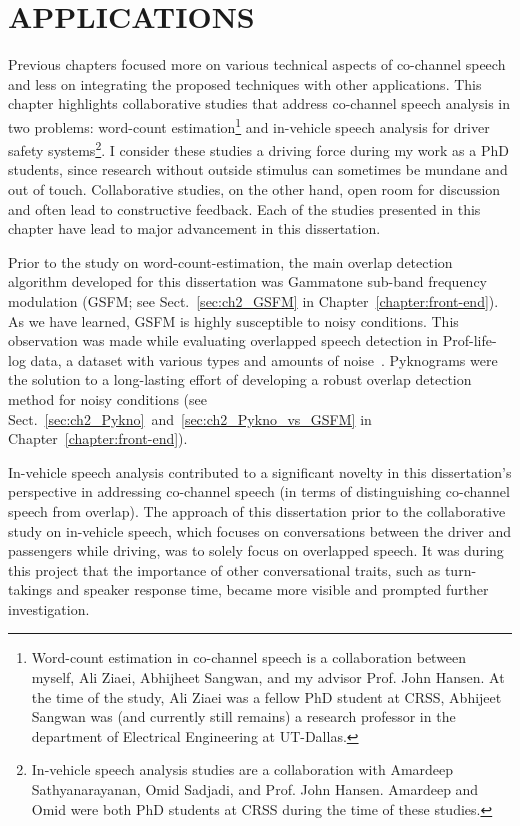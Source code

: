 \chapter{APPLICATIONS}
\label{chap:applications}

Previous chapters focused more on various technical aspects of co-channel speech and less on integrating the proposed techniques with other applications. 
This chapter highlights collaborative studies that address co-channel speech analysis in two problems: word-count estimation\footnote{Word-count estimation in co-channel speech is a collaboration between myself, Ali Ziaei, Abhijheet Sangwan, and my advisor Prof. John Hansen. At the time of the study, Ali Ziaei was a fellow PhD student at CRSS, Abhijeet Sangwan was (and currently still remains) a research professor in the department of Electrical Engineering at UT-Dallas.} and in-vehicle speech analysis for driver safety systems\footnote{In-vehicle speech analysis studies are a collaboration with Amardeep Sathyanarayanan, Omid Sadjadi, and Prof. John Hansen. Amardeep and Omid were both PhD students at CRSS during the time of these studies.}. 
I consider these studies a driving force during my work as a PhD students, since research without outside stimulus can sometimes be mundane and out of touch. 
Collaborative studies, on the other hand, open room for discussion and often lead to constructive feedback. 
Each of the studies presented in this chapter have lead to major advancement in this dissertation. 

Prior to the study on word-count-estimation, the main overlap detection algorithm developed for this dissertation was Gammatone sub-band frequency modulation (GSFM; see Sect.~\ref{sec:ch2_GSFM} in Chapter~\ref{chapter:front-end}). As we have learned, GSFM is highly susceptible to noisy conditions. 
This observation was made while evaluating overlapped speech detection in Prof-life-log data, a dataset with various types and amounts of noise~\cite{ziaei2013prof}. 
Pyknograms were the solution to a long-lasting effort of developing a robust overlap detection method for noisy conditions (see Sect.~\ref{sec:ch2_Pykno}~and~\ref{sec:ch2_Pykno_vs_GSFM} in Chapter~\ref{chapter:front-end}). 

In-vehicle speech analysis contributed to a significant novelty in this dissertation's perspective in addressing co-channel speech (in terms of distinguishing co-channel speech from overlap). 
The approach of this dissertation prior to the collaborative study on in-vehicle speech, which focuses on conversations between the driver and passengers while driving, was to solely focus on overlapped speech. 
It was during this project that the importance of other conversational traits, such as turn-takings and speaker response time, became more visible and prompted further investigation. 

